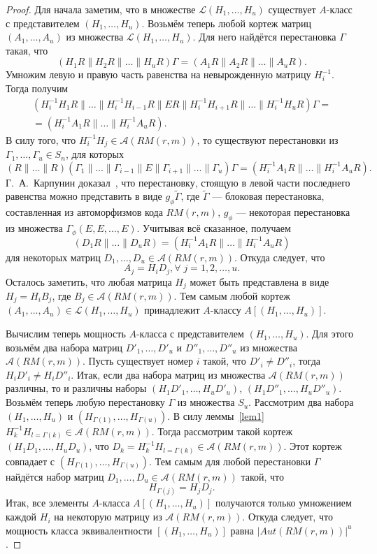 \begin{proof}
Для начала заметим, что в множестве $\mathcal L(H_1,\ldots,H_u)$
существует $A$-класс с представителем $(H_1,\ldots,H_u)$. Возьмём
теперь любой кортеж матриц $(A_1,\ldots,A_u)$ из множества
$\mathcal L(H_1,\ldots,H_u)$. Для него найдётся перестановка
$\Gamma$ такая, что
$$
(H_1R\|H_2R\|\ldots\|H_uR)\Gamma=(A_1R\|A_2R\|\ldots\|A_uR).
$$
Умножим левую и правую часть равенства на невырожденную матрицу
$H^{-1}_i$. Тогда получим
\begin{multline*}
(H^{-1}_iH_1R\|\ldots\|H^{-1}_iH_{i-1}R\|ER\|H^{-1}_iH_{i+1}R\|\ldots\|H^{-1}_iH_uR)\Gamma=\\=(H^{-1}_iA_1R\|\ldots\|H^{-1}_iA_uR).    
\end{multline*}
В силу того, что $H^{-1}_iH_j\in \mathcal A(RM(r,m))$, то
существуют перестановки из $\Gamma_1,\ldots,\Gamma_u\in S_n$, для
которых
$$
(R\|\ldots\|R)(\Gamma_1\|\ldots\|\Gamma_{i-1}\|E\|\Gamma_{i+1}\|\ldots\|\Gamma_u)\Gamma=(H^{-1}_iA_1R\|\ldots\|H^{-1}_iA_uR).
$$
Г.~А.~Карпунин доказал~\cite{Karpunin}, что перестановку, стоящую
в левой части последнего равенства можно представить в виде
$g_{\phi}\widetilde\Gamma$, где $\widetilde\Gamma$ --- блоковая
перестановка, составленная из автоморфизмов кода $RM(r,m)$,
$g_{\phi}$
--- некоторая перестановка из множества  $\Gamma_{\phi}(E,E,\ldots,E)$. Учитывая всё
сказанное, получаем
$$
(D_1R\|\ldots\|D_uR)=(H^{-1}_iA_1R\|\ldots\|H^{-1}_iA_uR)
$$
для некоторых матриц $D_1,\ldots,D_u\in \mathcal A(RM(r,m))$.
Откуда следует, что
$$
A_j=H_iD_j,\forall\;j=1,2,\ldots,u.
$$
Осталось заметить, что любая матрица $H_j$ может быть представлена
в виде $H_j=H_iB_j$, где $B_j\in\mathcal A(RM(r,m))$. Тем самым
любой кортеж $(A_1,\ldots,A_u)\in\mathcal L(H_1,\ldots,H_u)$
принадлежит $A$-классу $A[(H_1,\ldots,H_u)]$.

Вычислим теперь мощность $A$-класса с представителем
$(H_1,\ldots,H_u)$. Для этого возьмём два набора матриц $D'_1,\ldots,D'_u$ и
$D''_1,\ldots,D''_u$ из множества $\mathcal A(RM(r,m))$. Пусть
существует номер $i$ такой, что $D'_i\neq D''_i$, тогда
$H_iD'_i\neq H_iD''_i$. Итак, если два набора матриц из множества
$\mathcal A(RM(r,m))$ различны, то и различны наборы
$(H_1D'_1,\ldots,H_uD'_u)$, $(H_1D''_1,\ldots,H_uD''_u)$. Возьмём
теперь любую перестановку $\Gamma$ из множества $S_u$. Рассмотрим
два набора $(H_1,\ldots,H_u)$ и
$(H_{\Gamma(1)},\ldots,H_{\Gamma(u)})$. В силу леммы~\ref{lem1}
$H^{-1}_kH_{l=\Gamma(k)}\in\mathcal A(RM(r,m))$. Тогда рассмотрим такой
кортеж $(H_1D_1,\ldots,H_uD_u)$, что
$D_k=H^{-1}_kH_{l=\Gamma(k)}\in\mathcal A(RM(r,m))$. Этот кортеж
совпадает с $(H_{\Gamma(1)},\ldots,H_{\Gamma(u)})$. Тем самым для
любой перестановки $\Gamma$ найдётся набор матриц
$D_1,\ldots,D_u\in\mathcal A(RM(r,m))$ такой, что
$$
H_{\Gamma(j)}=H_jD_j.
$$
Итак, все элементы $A$-класса $A[(H_1,\ldots,H_u)]$ получаются
только умножением каждой $H_i$ на некоторую матрицу из $\mathcal
A(RM(r,m))$. Откуда следует, что мощность класса эквивалентности $[(H_1,\ldots,H_u)]$ равна $|Aut(RM(r,m))|^u$.
\end{proof}

